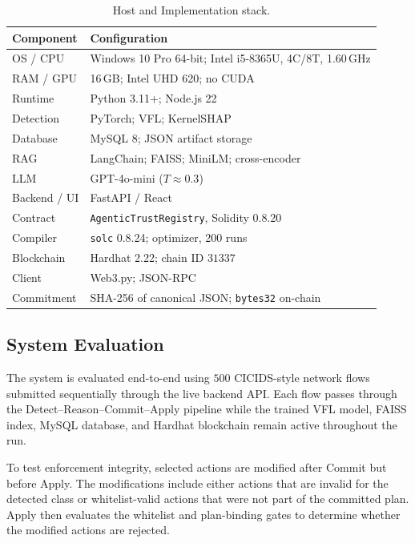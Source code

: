 \documentclass[10pt, conference]{IEEEtran}
\begin{document}
\begin{table}[t]
\centering
\caption{ Host and Implementation stack.}
\label{tab:stack}
\setlength{\tabcolsep}{4pt}
{\footnotesize
\begin{tabular}{@{}lp{5.0cm}@{}}
\hline
\textbf{Component} & \textbf{Configuration} \\
\hline
OS / CPU & Windows 10 Pro 64-bit; Intel i5-8365U, 4C/8T, 1.60\,GHz \\
RAM / GPU & 16\,GB; Intel UHD 620; no CUDA \\
Runtime & Python 3.11+; Node.js 22 \\
Detection & PyTorch; VFL; KernelSHAP \\
Database & MySQL 8; JSON artifact storage \\
RAG & LangChain; FAISS; MiniLM; cross-encoder \\
LLM & GPT-4o-mini ($T\approx0.3$) \\
Backend / UI & FastAPI / React \\
Contract & \texttt{AgenticTrustRegistry}, Solidity 0.8.20 \\
Compiler & \texttt{solc} 0.8.24; optimizer, 200 runs \\
Blockchain & Hardhat 2.22; chain ID $31337$ \\
Client & Web3.py; JSON-RPC \\
Commitment & SHA-256 of canonical JSON; \texttt{bytes32} on-chain \\
\hline
\end{tabular}}
\end{table}

\subsection{System Evaluation}

The system is evaluated end-to-end using $500$ CICIDS-style network flows submitted sequentially through the live backend API. Each flow passes through the Detect--Reason--Commit--Apply pipeline while the trained VFL model, FAISS index, MySQL database, and Hardhat blockchain remain active throughout the run.

To test enforcement integrity, selected actions are modified after Commit but before Apply. The modifications include either actions that are invalid for the detected class or whitelist-valid actions that were not part of the committed plan. Apply then evaluates the whitelist and plan-binding gates to determine whether the modified actions are rejected.
\end{document}
